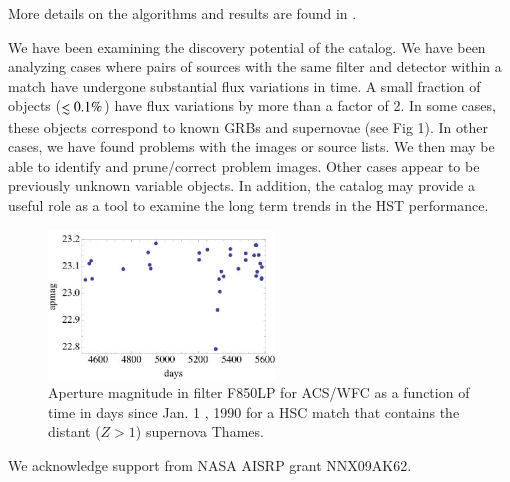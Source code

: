 \documentclass[11pt,twoside]{article}
\begin{document}
More details on the algorithms and results are found in \cite{2012arXiv1206.0644B}.

We have been examining the discovery potential of the catalog. 
We have been analyzing cases where pairs of sources with the same filter and detector
within a match have undergone substantial flux variations in time. A small fraction of objects ($\la 0.1 \%$)
have flux variations by more than a factor of 2. In some cases, these    objects correspond
to known GRBs and supernovae (see Fig 1).  In other cases, we have found problems with
the images or source lists. We then may be able to identify and prune/correct problem
images. Other cases appear to be previously unknown variable objects.
In addition, the catalog may provide a useful role as a tool to examine the long term trends
in the HST performance.


\begin{figure}
\centering
\includegraphics[width=6.0cm]{O21_1.eps}
\caption{Aperture magnitude in filter F850LP for ACS/WFC 
as a function of time in days since Jan. 1 , 1990 for a HSC match that contains 
the distant ($Z> 1$) supernova Thames.}
\end{figure}


\acknowledgements We acknowledge support from NASA AISRP grant NNX09AK62.


\end{document}
